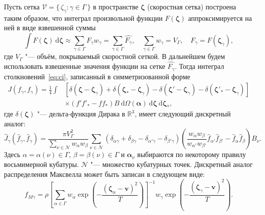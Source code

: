\documentclass[a4paper,12pt]{article}
\newcommand{\dd}{\:\mathrm{d}}
\newcommand{\dzeta}{\boldsymbol{\dd\zeta}}
\newcommand{\bzeta}{\boldsymbol{\zeta}}
\newcommand{\Nu}{\mathcal{N}}
\newcommand{\Set}[2]{\{\,{#1}:{#2}\,\}}
\begin{document}
Пусть сетка \(\mathcal{V} = \Set{\zeta_\gamma}{\gamma\in\Gamma}\) в пространстве \(\bzeta\)
(скоростная сетка) построена таким образом, что интеграл произвольной функции \(F(\bzeta)\)
аппроксимируется на ней в виде взвешенной суммы
\begin{equation}\label{eq:zeta_cubature}
    \int F(\bzeta) \dzeta \approx \sum_{\gamma\in\Gamma} F_\gamma w_\gamma =
        \sum_{\gamma\in\Gamma} \hat{F_\gamma},
        \quad \sum_{\gamma\in\Gamma} w_\gamma = V_\Gamma,
        \quad F_\gamma = F(\bzeta_\gamma),
\end{equation}
где \(V_\Gamma\) "--- объём, покрываемый скоростной сеткой.
В дальнейшем будем использовать взвешенные значения функции на сетке \(\hat{F_\gamma}\).
Тогда интеграл столкновений~\eqref{eq:ci}, записанный в симметризованной форме
\begin{equation}\label{eq:symm_ci}
    \begin{aligned}
    J(f_\gamma, f_\gamma) = \frac14\int &\left[
        \delta(\bzeta-\bzeta_\gamma) + \delta(\bzeta_*-\bzeta_\gamma)
        - \delta(\bzeta'-\bzeta_\gamma) - \delta(\bzeta'_*-\bzeta_\gamma)\right] \\
        &\times(f'f'_* - ff_*)B \dd\Omega(\boldsymbol{\alpha}) \dzeta\dzeta_*,
    \end{aligned}
\end{equation}
где \(\delta(\bzeta)\) "--- дельта-функция Дирака в \(\mathbb{R}^3\),
имеет следующий дискретный аналог:
\begin{equation}\label{eq:discrete_symm_ci}
    \hat{J}_\gamma(\hat{f}_\gamma, \hat{f}_\gamma) =
        \frac{\pi V_\Gamma^2}{\sum_{\nu\in\Nu} w_{\alpha}w_{\beta}}
        \sum_{\nu\in\Nu} \left(
            \delta_{\alpha\gamma} + \delta_{\beta\gamma}
            - \delta_{\alpha'\gamma} - \delta_{\beta'\gamma}
        \right)\left(
            \frac{w_{\alpha}w_{\beta}}{w_{\alpha'}w_{\beta'}}
            \hat{f}_{\alpha'}\hat{f}_{\beta'} - \hat{f}_{\alpha}\hat{f}_{\beta}
        \right)B_\nu.
\end{equation}
Здесь \(\alpha=\alpha(\nu)\in\Gamma\), \(\beta=\beta(\nu)\in\Gamma\) и \(\boldsymbol{\alpha}_\nu\)
выбираются по некоторому правилу восьмимерной кубатуры.
\(\Nu\) "--- множество кубатурных точек.
Дискретный аналог распределения Максвелла может быть записан в следующем виде:
\begin{equation}\label{eq:discrete_Maxwell}
    \hat{f}_{M\gamma} = \rho\left[\sum_{\alpha\in\Gamma}w_\alpha\exp
            \left(-\frac{(\bzeta_\alpha - \boldsymbol{v})^2}{T}\right)
        \right]^{-1}
        w_\gamma\exp\left(-\frac{(\bzeta_\gamma - \boldsymbol{v})^2}{T}\right).
\end{equation}
\end{document}
